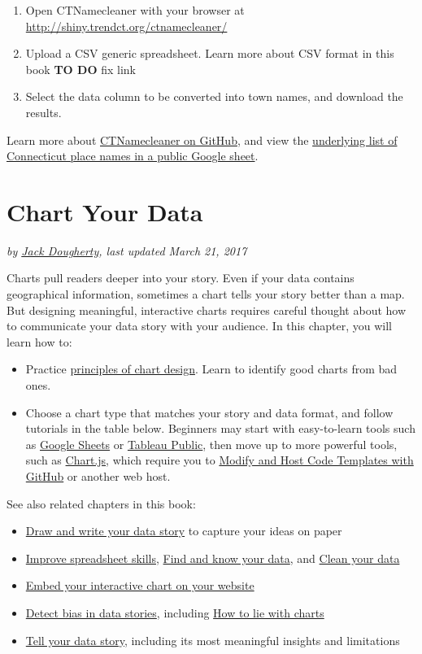\documentclass[
  english,
]{book}
\providecommand{\tightlist}{%
  \setlength{\itemsep}{0pt}\setlength{\parskip}{0pt}}
\begin{document}
\begin{enumerate}
\def\labelenumi{\arabic{enumi}.}
\tightlist
\item
  Open CTNamecleaner with your browser at \url{http://shiny.trendct.org/ctnamecleaner/}
\item
  Upload a CSV generic spreadsheet. Learn more about CSV format in this book \textbf{TO DO} fix link
\item
  Select the data column to be converted into town names, and download the results.
\end{enumerate}

Learn more about \href{https://github.com/trendct/ctnamecleaner}{CTNamecleaner on GitHub}, and view the \href{https://docs.google.com/spreadsheets/d/1WqZIGk2AkHXKYvd4uXy5a2nwyg529e7mMU5610Ale0g/edit\#gid=0}{underlying list of Connecticut place names in a public Google sheet}.

\hypertarget{chart}{%
\chapter{Chart Your Data}\label{chart}}

\emph{by \href{authors}{Jack Dougherty}, last updated March 21, 2017}

Charts pull readers deeper into your story. Even if your data contains geographical information, sometimes a chart tells your story better than a map. But designing meaningful, interactive charts requires careful thought about how to communicate your data story with your audience. In this chapter, you will learn how to:

\begin{itemize}
\tightlist
\item
  Practice \href{chart-design}{principles of chart design}. Learn to identify good charts from bad ones.
\item
  Choose a chart type that matches your story and data format, and follow tutorials in the table below. Beginners may start with easy-to-learn tools such as \href{chart-google-sheets}{Google Sheets} or \href{tableau-public}{Tableau Public}, then move up to more powerful tools, such as \href{chartjs}{Chart.js}, which require you to \href{github}{Modify and Host Code Templates with GitHub} or another web host.
\end{itemize}

See also related chapters in this book:

\begin{itemize}
\tightlist
\item
  \href{draw}{Draw and write your data story} to capture your ideas on paper
\item
  \href{spreadsheet}{Improve spreadsheet skills}, \href{find}{Find and know your data}, and \href{clean}{Clean your data}
\item
  \href{embed}{Embed your interactive chart on your website}
\item
  \href{detect}{Detect bias in data stories}, including \href{how-to-lie-with-charts}{How to lie with charts}
\item
  \href{story}{Tell your data story}, including its most meaningful insights and limitations
\end{itemize}
\end{document}
